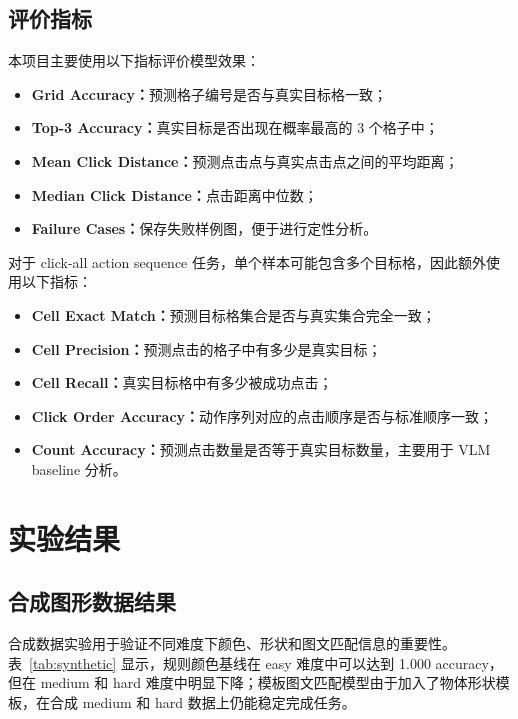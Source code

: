 \documentclass[UTF8,a4paper,12pt,fontset=fandol]{ctexart}
\begin{document}
\subsection{评价指标}

本项目主要使用以下指标评价模型效果：
\begin{itemize}[leftmargin=2em]
  \item \textbf{Grid Accuracy：}预测格子编号是否与真实目标格一致；
  \item \textbf{Top-3 Accuracy：}真实目标是否出现在概率最高的 3 个格子中；
  \item \textbf{Mean Click Distance：}预测点击点与真实点击点之间的平均距离；
  \item \textbf{Median Click Distance：}点击距离中位数；
  \item \textbf{Failure Cases：}保存失败样例图，便于进行定性分析。
\end{itemize}

对于 click-all action sequence 任务，单个样本可能包含多个目标格，因此额外使用以下指标：
\begin{itemize}[leftmargin=2em]
  \item \textbf{Cell Exact Match：}预测目标格集合是否与真实集合完全一致；
  \item \textbf{Cell Precision：}预测点击的格子中有多少是真实目标；
  \item \textbf{Cell Recall：}真实目标格中有多少被成功点击；
  \item \textbf{Click Order Accuracy：}动作序列对应的点击顺序是否与标准顺序一致；
  \item \textbf{Count Accuracy：}预测点击数量是否等于真实目标数量，主要用于 VLM baseline 分析。
\end{itemize}

\section{实验结果}

\subsection{合成图形数据结果}

合成数据实验用于验证不同难度下颜色、形状和图文匹配信息的重要性。表~\ref{tab:synthetic} 显示，规则颜色基线在 easy 难度中可以达到 1.000 accuracy，但在 medium 和 hard 难度中明显下降；模板图文匹配模型由于加入了物体形状模板，在合成 medium 和 hard 数据上仍能稳定完成任务。
\end{document}
